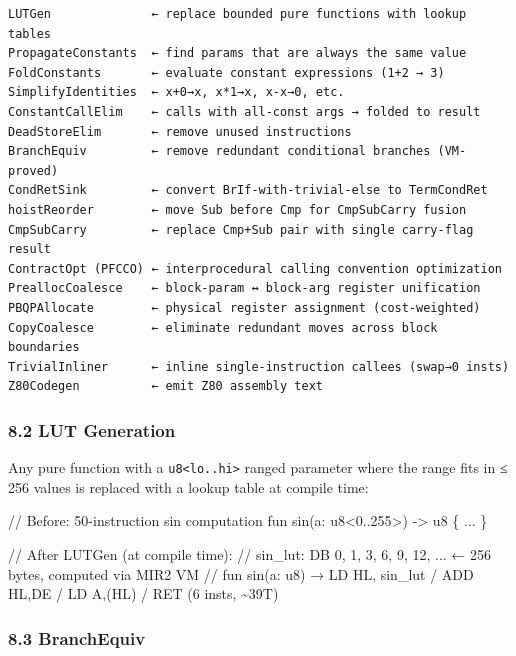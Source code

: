 \documentclass[
  11pt,
]{article}
\newenvironment{Shaded}{\begin{snugshade}}{\end{snugshade}}
\newcommand{\NormalTok}[1]{#1}
\begin{document}
\begin{verbatim}
LUTGen              ← replace bounded pure functions with lookup tables
PropagateConstants  ← find params that are always the same value
FoldConstants       ← evaluate constant expressions (1+2 → 3)
SimplifyIdentities  ← x+0→x, x*1→x, x-x→0, etc.
ConstantCallElim    ← calls with all-const args → folded to result
DeadStoreElim       ← remove unused instructions
BranchEquiv         ← remove redundant conditional branches (VM-proved)
CondRetSink         ← convert BrIf-with-trivial-else to TermCondRet
hoistReorder        ← move Sub before Cmp for CmpSubCarry fusion
CmpSubCarry         ← replace Cmp+Sub pair with single carry-flag result
ContractOpt (PFCCO) ← interprocedural calling convention optimization
PreallocCoalesce    ← block-param ↔ block-arg register unification
PBQPAllocate        ← physical register assignment (cost-weighted)
CopyCoalesce        ← eliminate redundant moves across block boundaries
TrivialInliner      ← inline single-instruction callees (swap→0 insts)
Z80Codegen          ← emit Z80 assembly text
\end{verbatim}

\hypertarget{lut-generation}{%
\subsubsection{8.2 LUT Generation}\label{lut-generation}}

Any pure function with a \texttt{u8\textless{}lo..hi\textgreater{}}
ranged parameter where the range fits in ≤ 256 values is replaced with a
lookup table at compile time:

\begin{Shaded}
\begin{Highlighting}[]
\NormalTok{// Before: 50{-}instruction sin computation}
\NormalTok{fun sin(a: u8\textless{}0..255\textgreater{}) {-}\textgreater{} u8 \{ ... \}}

\NormalTok{// After LUTGen (at compile time):}
\NormalTok{// sin\_lut: DB 0, 1, 3, 6, 9, 12, ...  ← 256 bytes, computed via MIR2 VM}
\NormalTok{// fun sin(a: u8) → LD HL, sin\_lut / ADD HL,DE / LD A,(HL) / RET  (6 insts, \textasciitilde{}39T)}
\end{Highlighting}
\end{Shaded}

\hypertarget{branchequiv}{%
\subsubsection{8.3 BranchEquiv}\label{branchequiv}}
\end{document}
